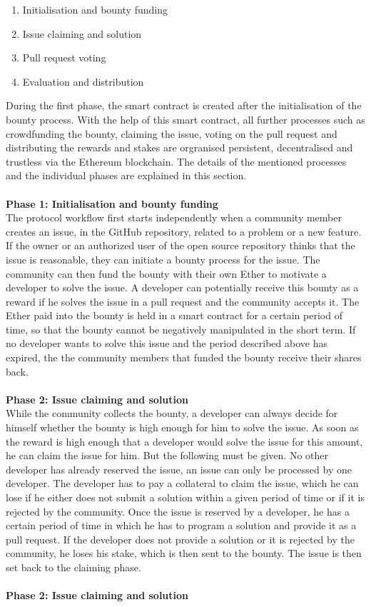 \documentclass[sigconf]{acmart}
\begin{document}
\begin{enumerate}
  \item Initialisation and bounty funding
  \item Issue claiming and solution
  \item Pull request voting
  \item Evaluation and distribution \\
\end{enumerate}
During the first phase, the smart contract is created after the initialisation of the bounty process. With the help of this smart contract, 
all further processes such as crowdfunding the bounty, claiming the issue, voting on the pull request and distributing the rewards and 
stakes are orgranised persistent, decentralised and trustless via the Ethereum blockchain. The details of the mentioned processes and 
the individual phases are explained in this section. \\ \\
\textbf{Phase 1: Initialisation and bounty funding} \\
The protocol workflow first starts independently when a community member creates an issue, in the GitHub repository, 
related to a problem or a new feature. If the owner or an authorized user of the open source repository thinks that the issue 
is reasonable, they can initiate a bounty process for the issue. The community can then fund the bounty with their own Ether
 to motivate a developer to solve the issue. A developer can potentially receive this bounty as a reward  if he solves the 
issue in a pull request and the community accepts it. The Ether paid into the bounty is held in a smart contract for a certain 
period of time, so that the bounty cannot be negatively manipulated in the short term. If no developer wants to solve this issue
and the period described above has expired, the the community members that funded the bounty receive their shares back. \\ \\
\textbf{Phase 2: Issue claiming and solution} \\
While the community collects the bounty, a developer can always decide for himself whether the bounty is high enough for him to 
solve the issue. As soon as the reward is high enough that a developer would solve the issue for this amount, he can claim the
issue for him. But the following must be given. No other developer has already reserved the issue, an issue can only be processed 
by one developer. The developer has to pay a collateral to claim the issue, which he can lose if he either does not submit 
a solution within a given period of time or if it is rejected by the community. Once the issue is reserved by a developer, 
he has a certain period of time in which he has to program a solution and provide it as a pull request. If the developer does not 
provide a solution or it is rejected by the community, he loses his stake, which is then sent to the bounty. The issue is then set back 
to the claiming phase. \\ \\
\textbf{Phase 2: Issue claiming and solution} \\
\end{document}
